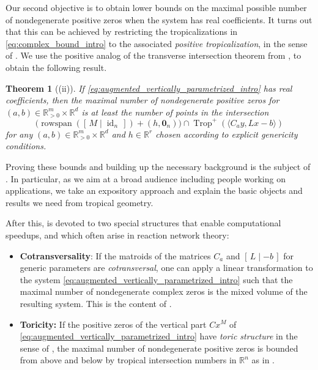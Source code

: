 \documentclass[11pt,reqno,a4paper]{amsart}
\numberwithin{equation}{section}
\theoremstyle{theoremstyle}
\newtheorem{theoremalphabetic}{Theorem}
\theoremstyle{examplestyle}
\newcommand{\RR}{\mathbb{R}}
\DeclareMathOperator{\rowspan}{rowspan}
\DeclareMathOperator{\id}{id}
\DeclareMathOperator{\Trop}{Trop}
\begin{document}
Our second objective is to obtain lower bounds on the maximal possible number of nondegenerate positive zeros when the system has real coefficients. It turns out that this can be achieved by restricting the tropicalizations in \eqref{eq:complex_bound_intro} to the associated \emph{positive tropicalization}, in the sense of \cite{Alessandrini2007,JellScheidererYu}. We use the positive analog of the transverse intersection theorem from \cite{RoseTelek24}, to obtain the following result.

\begin{theoremalphabetic}[{(ii)}]
If \eqref{eq:augmented_vertically_parametrized_intro} has real coefficients, then
the maximal number of nondegenerate positive zeros  for $(a,b)\in \RR^m_{>0}\times \RR^d$ is at least 
the number of points in the intersection
\[\big(\rowspan([\,M\mid\id_n\,])+(h,\mathbf{0}_{n})\big)\cap \Trop^+(\langle C_a y,Lx-b\rangle)\]
for any 
$(a,b)\in \RR^m_{>0}\times \RR^d$ and $h\in\RR^r$ chosen according to explicit genericity conditions. 
\end{theoremalphabetic}

Proving these bounds and building up the necessary background is the subject of . 
In particular, as we aim at a broad audience including people working on applications, we take an expository approach and explain the basic objects and results we need from tropical geometry.


After this,  is devoted to two special structures that enable computational speedups, and which often  arise in reaction network theory:
\begin{itemize}
    \item \textbf{Cotransversality}: If the matroids of the matrices $C_a$ and $[\,L\mid -b\,]$ for generic parameters are \emph{cotransversal}, one can apply a linear transformation to the system \eqref{eq:augmented_vertically_parametrized_intro} such that the maximal number of nondegenerate complex zeros is the mixed volume of the resulting system. This is the content of .
    \item \textbf{Toricity:} If the positive zeros of the vertical part $C x^M$ of \eqref{eq:augmented_vertically_parametrized_intro} have \emph{toric structure} in the sense of \cite{FeliuHenriksson2024}, the maximal number of nondegenerate positive zeros is bounded from above and below by tropical intersection numbers in $\RR^n$ as in .
\end{itemize}
\end{document}
